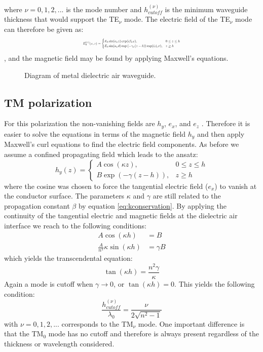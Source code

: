 \documentclass[main.tex]{subfile}
\begin{document}
where $\nu = 0,1,2,... $ is the mode number and $h_{cutoff}^{(\nu)}$ is the minimum waveguide thickness that would support the TE$_{\nu}$ mode.
The electric field of the TE$_\nu$ mode can therefore  be given as:
\begin{equation}
\label{eq:ETe}
\resizebox{0.4\textwidth}{!}{$
E_y^{(\nu)}(x,z)= 
\begin{cases}
E_0\sin(\kappa_\nu z)\exp(i \beta_\nu x),  &  0\leq z \leq h \\ 
E_0 \sin(\kappa_\nu d)\exp\left(-\gamma_\nu (z-h)\right)\exp(i \beta_\nu x),  &  z \geq h
\end{cases}$}
\end{equation}
, and the magnetic field may be found by applying Maxwell's equations.
\begin{figure}[t!]
\caption{Diagram of metal dielectric air waveguide.}
\label{MDAfig}
\end{figure}
\subsection*{TM polarization}
For this polarization the non-vanishing fields are $h_y$, $e_x$, and $e_z$ . Therefore it is easier to solve the equations in terms of the magnetic field $h_y$ and then apply Maxwell's curl equations to find the electric field components.  As before we assume a confined propagating field which leads to the ansatz: 
\begin{equation}
h_y(z)= 
\begin{cases}
A\cos(\kappa z),  &  0\leq z \leq h \\ 
B\exp\left(-\gamma (z-h)\right),  &  z \geq h
\end{cases}
\end{equation}
where the cosine was chosen to force the tangential electric field ($e_x$) to vanish at the conductor surface. The parameters $\kappa$ and $\gamma$ are still related to the propagation constant $\beta$ by equation \ref{eq:kconservation}. By applying the continuity of the tangential electric and magnetic fields at the dielectric air interface we reach to the following conditions: 
\begin{equation}
\label{eq:BCTM}
\begin{aligned}
A\cos(\kappa h)&=B
\\ \frac{A}{n^2}\kappa \sin(\kappa h)& = \gamma B
\end{aligned}
\end{equation}
which yields the transcendental equation: 
\begin{equation}
\label{eq:modeTM}
\tan(\kappa h)=\frac{n^2\gamma}{\kappa}
\end{equation}
Again a mode is cutoff when $\gamma \rightarrow 0 $, or $\tan (\kappa h)=0$. This yields the following condition:
\begin{equation}
\label{eq:cutTM}
\frac{h_{cutoff}^{(\nu)}}{\lambda_0}= \frac{\nu}{2\sqrt{n^2 -1}} 
\end{equation}
with $\nu = 0,1,2,...$ corresponds to the TM$_\nu$ mode. One important difference is that the TM$_0$ mode has no cutoff and therefore is always present regardless of the thickness or wavelength considered.  
\end{document}

